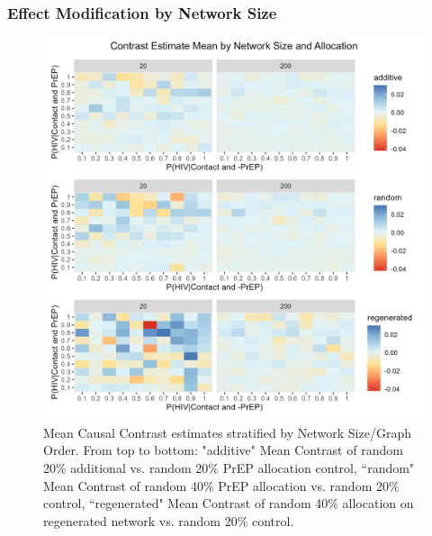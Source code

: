 \documentclass{article}
\theoremstyle{definition}
\begin{document}
\subsubsection{Effect Modification by Network Size}
\begin{figure}[H]
    \centering
    \includegraphics[scale=0.8]{Figures/Network Size Mean Plot.png}
    \caption{Mean Causal Contrast estimates stratified by Network Size/Graph Order. From top to bottom: "additive" Mean Contrast of random 20\% additional vs. random 20\% PrEP allocation control, ``random" Mean Contrast of random 40\% PrEP allocation vs. random 20\% control, ``regenerated" Mean Contrast of random 40\% allocation on regenerated network vs. random 20\% control. }
    \label{fig:Figure 7}
\end{figure}
\end{document}
